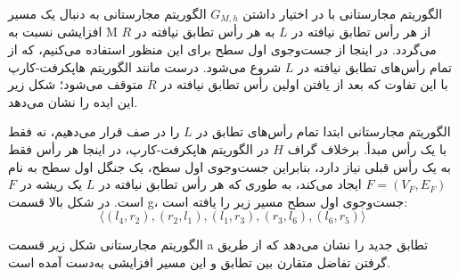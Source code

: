 \begin{itemframe}{الگوریتم مجارستانی}
\decLineSpace[0mm]
\itm
با در اختیار داشتن $G_{M,h}$ الگوریتم مجارستانی به دنبال یک مسیر افزایشی نسبت به M از هر رأس تطابق نیافته در $L$ به هر رأس تطابق نیافته در $R$ می‌گردد.
\itm
در اینجا از جست‌وجوی اول سطح برای این منظور استفاده می‌کنیم، که از تمام رأس‌های تطابق نیافته در $L$ شروع می‌شود. درست مانند الگوریتم هاپکرفت-کارپ با این تفاوت که بعد از یافتن اولین رأس تطابق نیافته در $R$ متوقف می‌شود؛ شکل زیر این ایده را نشان می‌دهد.

\end{itemframe}

\begin{itemframe}{الگوریتم مجارستانی}
\itm
ابتدا تمام رأس‌های تطابق در $L$ را در صف قرار می‌دهیم، نه فقط با یک رأس مبدأ.
برخلاف گراف $H$ در الگوریتم هاپکرفت-کارپ، در اینجا هر رأس فقط به یک رأس قبلی نیاز دارد، بنابراین جست‌وجوی اول سطح، یک جنگل اول سطح
به نام $F = (V_F, E_F)$ ایجاد می‌کند، به طوری که هر رأس تطابق نیافته در $L$ یک ریشه در $F$ است.
\itm
در شکل بالا قسمت g، جست‌وجوی اول سطح مسیر زیر را یافته است:
$$
\langle (l_4, r_2), (r_2, l_1), (l_1, r_3), (r_3, l_6), (l_6, r_5) \rangle
$$

\end{itemframe}

\begin{itemframe}{الگوریتم مجارستانی}
\itm
شکل زیر قسمت a تطابق جدید را نشان می‌دهد که از طریق گرفتن تفاضل متقارن بین تطابق و این مسیر افزایشی به‌دست آمده است.
\end{itemframe}
